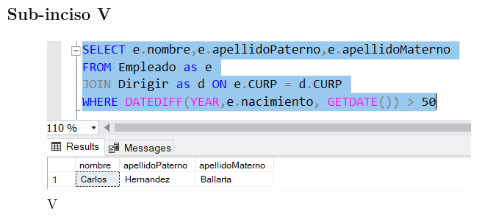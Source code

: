 \documentclass[a4paper, 12pt]{report}
\begin{document}
\subsubsection*{Sub-inciso V}
    \begin{figure}
        \includegraphics[width=\textwidth]
            {img/V.png}\hfill
    \caption{V}
    \end{figure}
\end{document}
